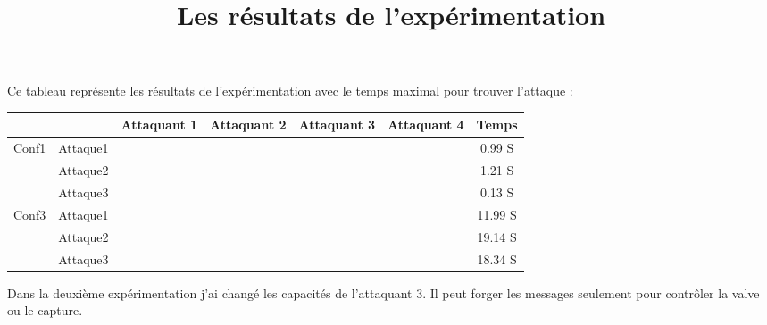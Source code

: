 \documentclass[10pt,a4paper]{article}
\author{}
\date{}
\title{Les résultats de l’expérimentation}
\newcommand{\cmark}{\ding{51}}%
\newcommand{\xmark}{\ding{55}}%
\begin{document}
\maketitle
Ce tableau représente les résultats de l’expérimentation avec le temps maximal pour trouver l’attaque :\newline

\small
\begin{tabular}{ll|c|c|c|c|c|}
\cline{3-7}
&  &  Attaquant 1 &  Attaquant 2 &  Attaquant 3 & Attaquant 4 & Temps  \\ \hline
\multicolumn{1}{|l|}{\multirow{3}{*}{Conf1}} & Attaque1 &  \color{green}{\cmark} & \color{green}{\cmark} & \color{green}{\cmark} & \color{red}{\xmark}  & 0.99 S  \\ \cline{2-7} 
\multicolumn{1}{|l|}{}& Attaque2 & \color{green}{\cmark} & \color{green}{\cmark} & \color{green}{\cmark} & \color{red}{\xmark} & 1.21 S  \\ \cline{2-7} 
\multicolumn{1}{|l|}{}& Attaque3 & \color{green}{\cmark} & \color{green}{\cmark} & \color{green}{\cmark} & \color{red}{\xmark} & 0.13 S  \\ \hline
\multicolumn{1}{|l|}{\multirow{3}{*}{Conf3}} & Attaque1 & \color{green}{\cmark} & \color{green}{\cmark} & \color{green}{\cmark} & \color{red}{\xmark} &  11.99 S\\ \cline{2-7} 
\multicolumn{1}{|l|}{}& Attaque2 & \color{green}{\cmark} & \color{green}{\cmark} & \color{green}{\cmark} & \color{red}{\xmark} & 19.14 S  \\ \cline{2-7} 
\multicolumn{1}{|l|}{}& Attaque3 & \color{green}{\cmark} & \color{green}{\cmark} & \color{green}{\cmark} & \color{red}{\xmark} & 18.34  S \\ \hline
\end{tabular}
\medskip

Dans la deuxième expérimentation j’ai changé les capacités de l’attaquant 3. Il peut forger les messages seulement pour contrôler la valve ou le capture.\newline 
\end{document}
